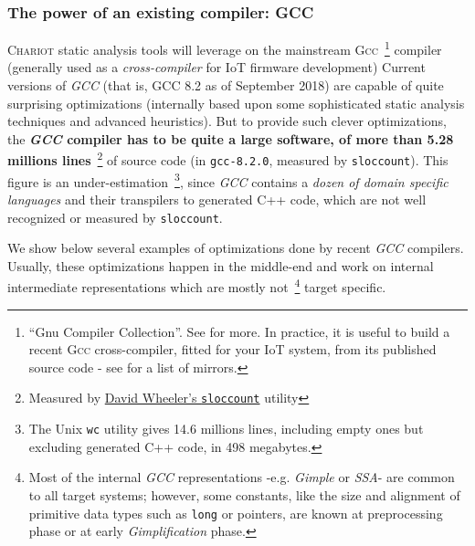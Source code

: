 
\subsubsection{The power of an existing compiler: GCC}

\textsc{Chariot} static analysis tools will leverage on the mainstream
\textsc{Gcc}~\footnote{``Gnu Compiler Collection''. See
   for more. In practice, it is useful to
  build a recent \textsc{Gcc} cross-compiler, fitted for your IoT
  system, from its published source code - see
   for a list of mirrors.}
compiler (generally used as a
\emph{cross-compiler} for IoT
firmware development) Current versions of \emph{GCC} (that is, GCC 8.2
as of September 2018) are capable of quite surprising optimizations
(internally based upon some sophisticated static analysis techniques
and advanced heuristics). But to provide such clever optimizations,
the \textbf{\emph{GCC} compiler has to be quite a large software, of
  more than 5.28 millions lines}~\footnote{Measured by
  \href{https://dwheeler.com/sloccount/}{David Wheeler's
    \texttt{sloccount}} utility} of source code (in
\texttt{gcc-8.2.0}, measured by \texttt{sloccount}). This figure is an
under-estimation~\footnote{The Unix \texttt{wc} utility gives 14.6
  millions lines, including empty ones but excluding generated C++
  code, in 498 megabytes.}, since \emph{GCC} contains a \emph{dozen of
  domain specific languages} and their transpilers to generated C++
code, which are not well recognized or measured by \texttt{sloccount}.


\medskip

We show below several examples of optimizations done by recent
\emph{GCC} compilers. Usually, these optimizations happen in the
middle-end and work on internal intermediate representations which are
mostly not~\footnote{Most of the internal \emph{GCC} representations
  -e.g. \emph{Gimple} or \emph{SSA}- are common to all target systems;
  however, some constants, like the size and alignment of primitive
  data types such as \texttt{long} or pointers, are known at
  preprocessing phase or at early \emph{Gimplification} phase.} target
specific.

